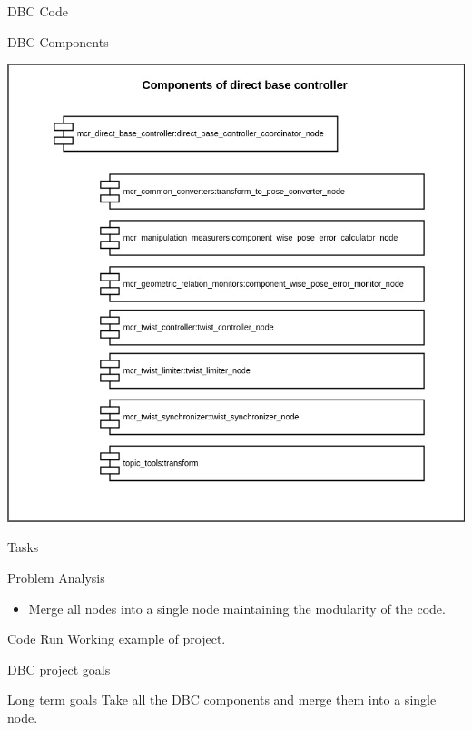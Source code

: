\documentclass[9pt,usenames,dvipsnames]{beamer}
\title{\topicClass}
\subtitle{\topicTitle}
\date{Presentation date: \topicDueDate}
\author[\authorLastName]{\authorFullName}
\begin{document}
\maketitle

\begin{frame}{DBC Code}
	\begin{alertblock}{DBC Components}
	\begin{center}
		\includegraphics[width=.7\textwidth]{dbc_components.jpeg}
	\end{center}
    \end{alertblock}
\end{frame}

\begin{frame}{Tasks}
	\begin{alertblock}{Problem Analysis}
	\begin{itemize}
	\item Merge all nodes into a single node maintaining the modularity of the code.
	\end{itemize}
    \end{alertblock}
    
    \begin{alertblock}{Code Run}
    Working example of project.
    \end{alertblock}
\end{frame}

\begin{frame}{DBC project goals}
	\begin{alertblock}{Long term goals}
    	Take all the DBC components and merge them into a single node.
    \end{alertblock}
\end{frame}
\end{document}
